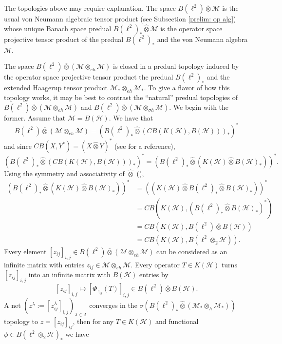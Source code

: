 \documentclass[12pt]{article}
\theoremstyle{definition}
\newenvironment{remark}
  {\pushQED{\qed}\renewcommand{\qedsymbol}{\textcircled{\tiny R}}\remarkx}
  {\popQED\endremarkx}
\newcommand{\mc}[1]{\mathcal{#1}}
\newcommand{\<}{\langle}
\renewcommand{\>}{\rangle}
\renewcommand{\hat}[1]{\widehat{#1}}
\newcommand{\eh}{\otimes_{eh}}
\renewcommand{\bar}[1]{\overline{#1}}
\begin{document}
\begin{remark} \label{rmk: gp-topologies}
    The topologies above may require explanation. The space $B(\ell^2) \overline{\otimes} \mc M$ is the usual von Neumann algebraic tensor product (see Subsection \ref{prelim: op alg}) whose unique Banach space predual $B(\ell^2)_* \widehat \otimes \mc M$ is the operator space projective tensor product of the predual $B(\ell^2)_*$ and the von Neumann algebra $\mc M$.
    
    The space $B(\ell^2) \overline{\otimes} (\mc M \otimes_{eh} \mc M)$ is closed in a predual topology induced by the operator space projective tensor product the predual $B(\ell^2)_*$ and the extended Haagerup tensor product $\mc M_* \eh \mc M_*$. To give a flavor of how this topology works, it may be best to contrast the ``natural'' predual topologies of $B(\ell^2) \overline{\otimes} (\mc M \otimes_{eh} \mc M)$ and $B(\ell^2) \overline{\otimes} (\mc M \otimes_{\sigma h} \mc M)$. We begin with the former. Assume that $\mc M = B(\mc H)$. We have that 
    \[
    B(\ell^2) \overline \otimes (\mc M \otimes_{eh} \mc M) = (B(\ell^2)_* \hat \otimes (CB(K(\mc H),B(\mc H)))_*)^*
    \]
    and since $CB(X,Y^*) = (X \hat \otimes Y)^*$ (see \cite[Theorem 4.1]{intro-op-sp-pisier} for a reference),
    \[
    (B(\ell^2)_* \hat \otimes (CB(K(\mc H),B(\mc H)))_*)^* = (B(\ell^2)_* \hat \otimes (K(\mc H) \hat \otimes B(\mc H)_*))^*.
    \]
    Using the symmetry and associativity of $\hat \otimes$ (\cite[Chapter 1.2.2]{opsptennorm}), 
    \begin{align*}
    (B(\ell^2)_* \hat \otimes (K(\mc H) \hat \otimes B(\mc H)_*))^* &= ((K(\mc H) \hat \otimes B(\ell^2)_* \hat \otimes B(\mc H)_*))^* \\
    &= CB(K(\mc H), (B(\ell^2)_* \hat \otimes B(\mc H)_*)^*) \\
    &= CB(K(\mc H), B(\ell^2) \bar \otimes B(\mc H)) \\
    &= CB(K(\mc H), B(\ell^2 \otimes_2 \mc H)).
    \end{align*}
    Every element $[z_{ij}]_{i,j} \in B(\ell^2) \overline{\otimes} (\mc M \otimes_{eh} \mc M)$ can be considered as an infinite matrix with entries $z_{ij} \in \mc M \eh \mc M$. Every operator $T \in K(\mc H)$ turns $[z_{ij}]_{i,j}$ into an infinite matrix with $B(\mc H)$ entries by
    \[
    [z_{ij}]_{i,j} \mapsto [\Phi_{z_{ij}}(T)]_{i,j} \in B(\ell^2) \overline{\otimes} B(\mc H).
    \]
    A net $(z^\lambda := [z^\lambda _{ij}]_{i,j})_{\lambda \in \Lambda}$ converges in the $\sigma(B(\ell^2)_* \hat \otimes (\mc M_* \otimes_{h} \mc M_*))$ topology to $z = [z_{ij}]_{ij}$, then for any $T \in K(\mc H)$ and functional $\phi \in B(\ell^2 \otimes_2 \mc H)_*$ we have 

\end{remark}
\end{document}
